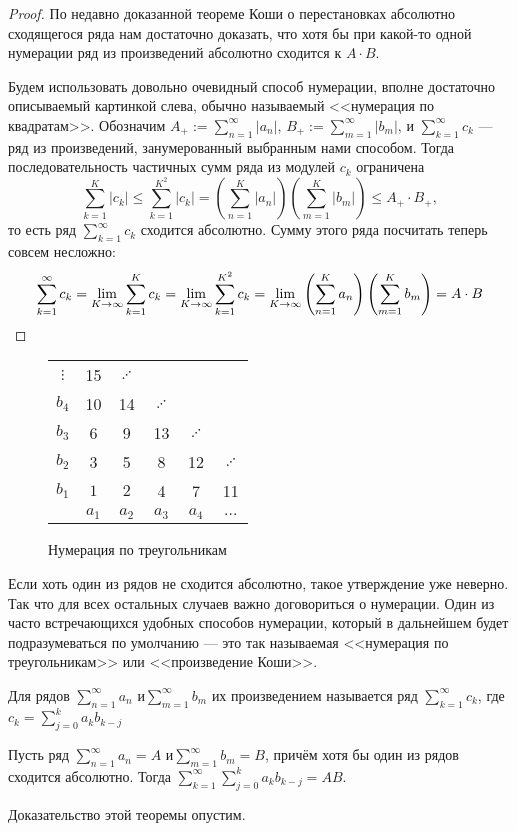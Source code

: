 \documentclass[a4paper, 12pt]{article}
\begin{document}
	\begin{proof} По недавно доказанной теореме Коши о перестановках абсолютно сходящегося ряда нам достаточно доказать, что хотя бы при какой-то одной нумерации ряд из произведений абсолютно сходится к $A\cdot B$.	
		
		Будем использовать довольно очевидный способ нумерации, вполне достаточно описываемый картинкой слева, обычно называемый <<нумерация по квадратам>>. 	Обозначим $A_+ := \sum\limits_{n=1}^{\infty}|a_n|$,  $B_+ := \sum\limits_{m=1}^{\infty}|b_m|$, и $\sum\limits_{k=1}^{\infty}c_k$ --- ряд из произведений, занумерованный выбранным нами способом. Тогда последовательность частичных сумм ряда из модулей $c_k$ ограничена \\
		\[
		\sum\limits_{k=1}^{K}|c_k| \leq \sum\limits_{k=1}^{K^2}|c_k| = \left(\sum\limits_{n=1}^{K}|a_n|\right)\left(\sum\limits_{m=1}^{K}|b_m|\right) \leq A_+\cdot B_+,
		\] 
		то есть ряд $\sum\limits_{k=1}^{\infty}c_k$ сходится абсолютно. 
		Сумму этого ряда посчитать теперь совсем несложно:
		\[\sum\limits_{k=1}^{\infty}c_k = \lim\limits_{K\rightarrow \infty} \sum\limits_{k=1}^{K}c_k = \lim\limits_{K\rightarrow \infty} \sum\limits_{k=1}^{K^2}c_k = \lim\limits_{K\rightarrow \infty} \left(\sum\limits_{n=1}^{K}a_n\right)\left(\sum\limits_{m=1}^{K}b_m\right)=A\cdot B
		\]
		\end{proof}
		
		\newpage
	\begin{wrapfigure}{r}{0.3\linewidth}
		\begin{tabular}[t]{c|ccccc}
			$\vdots$ &15& $\iddots$& & & \\
			$b_4$ & 10 & 14&$\iddots$ &&  \\
			$b_3$ & 6 & 9 & 13&$\iddots$ &   \\
			$b_2$ & 3 & 5& 8 & 12&$\iddots$ \\
			$b_1$ & $1$ & $2$ &4&7&11\\
			\hline
			& $a_1$ & $a_2$ & $a_3$ & $a_4$ &$\dots$ \\
		\end{tabular}
		\caption{Нумерация по треугольникам}
		\vspace{-60pt}
	\end{wrapfigure}
	Если хоть один из рядов не сходится абсолютно, такое утверждение уже неверно. Так что для всех остальных случаев важно договориться о нумерации. Один из часто встречающихся удобных способов нумерации, который в дальнейшем будет подразумеваться по умолчанию --- это так называемая <<нумерация по треугольникам>> или <<произведение Коши>>.
	\begin{Def}
		Для рядов $\sum\limits_{n=1}^{\infty}a_n$ и$ \sum\limits_{m=1}^{\infty}b_m$ их произведением называется ряд  $\sum\limits_{k=1}^{\infty}c_k$, где $c_k =\sum\limits_{j=0}^{k}a_kb_{k-j}$
	\end{Def}
	
	\begin{Theorem}[Мертенса]
		Пусть ряд $\sum\limits_{n=1}^{\infty}a_n = A $ и$ \sum\limits_{m=1}^{\infty}b_m = B$, причём хотя бы один из рядов сходится абсолютно. Тогда $\sum\limits_{k=1}^{\infty}\sum\limits_{j=0}^{k}a_kb_{k-j} = AB.$
	\end{Theorem}
	
	Доказательство этой теоремы опустим.
\end{document}
